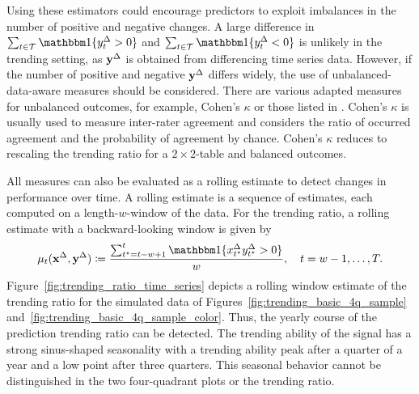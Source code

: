 Using these estimators could encourage predictors to exploit imbalances in the number of positive and negative changes. 
A large difference in $\sum_{t \in \mathcal{T}} \ind{\diffyt > 0}$ and $\sum_{t \in \mathcal{T}} \ind{\diffyt < 0}$ is unlikely in the trending setting, as $\mathbf{y}^{\Delta}$ is obtained from differencing time series data. 
However, if the number of positive and negative $\mathbf{y}^{\Delta}$ differs widely, the use of unbalanced-data-aware measures should be considered.
There are various adapted measures for unbalanced outcomes, for example, Cohen's $\kappa$ \parencite{Cohen1960} or those listed in \textcite[Table 3.3]{Jolliffe2012}.
Cohen's $\kappa$ is usually used to measure inter-rater agreement and considers the ratio of occurred agreement and the probability of agreement by chance.
Cohen's $\kappa$ reduces to rescaling the trending ratio for a $2\times2$-table and balanced outcomes.

All measures can also be evaluated as a rolling estimate to detect changes in performance over time. 
A rolling estimate is a sequence of estimates, each computed on a length-$w$-window of the data.
For the trending ratio, a rolling estimate with a backward-looking  window is given by
\begin{equation*}
    \acc_t (\diffx, \diffy) \coloneqq \frac{\sum_{t^\star = t-w + 1}^{t} \ind{\diffxt[t^\star] \diffyt[t^\star] > 0}}{w}, \quad t = w-1, \dots, T.\label{eq:acc_rolling}
\end{equation*}
Figure~\ref{fig:trending_ratio_time_series} depicts a rolling window estimate of the trending ratio for the simulated data of Figures~\ref{fig:trending_basic_4q_sample} and~\ref{fig:trending_basic_4q_sample_color}.
Thus, the yearly course of the prediction trending ratio can be detected.
The trending ability of the signal has a strong sinus-shaped seasonality with a trending ability peak after a quarter of a year and a low point after three quarters.
This seasonal behavior cannot be distinguished in the two four-quadrant plots or the trending ratio.


